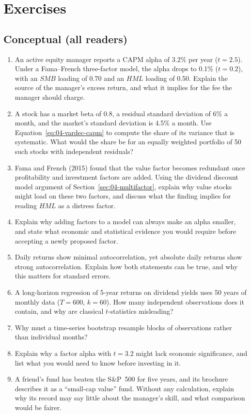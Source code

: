\section*{Exercises}

\subsection*{Conceptual (all readers)}
\begin{enumerate}
  \item An active equity manager reports a CAPM alpha of 3.2\% per year ($t = 2.5$). Under a Fama--French three-factor model, the alpha drops to 0.1\% ($t = 0.2$), with an $SMB$ loading of 0.70 and an $HML$ loading of 0.50. Explain the source of the manager's excess return, and what it implies for the fee the manager should charge.
  \item A stock has a market beta of 0.8, a residual standard deviation of 6\% a month, and the market's standard deviation is 4.5\% a month. Use Equation~\eqref{eq:04-vardec-capm} to compute the share of its variance that is systematic. What would the share be for an equally weighted portfolio of 50 such stocks with independent residuals?
  \item Fama and French (2015) found that the value factor becomes redundant once profitability and investment factors are added. Using the dividend discount model argument of Section~\ref{sec:04-multifactor}, explain why value stocks might load on these two factors, and discuss what the finding implies for reading $HML$ as a distress factor.
  \item Explain why adding factors to a model can always make an alpha smaller, and state what economic and statistical evidence you would require before accepting a newly proposed factor.
  \item Daily returns show minimal autocorrelation, yet absolute daily returns show strong autocorrelation. Explain how both statements can be true, and why this matters for standard errors.
  \item A long-horizon regression of 5-year returns on dividend yields uses 50 years of monthly data ($T=600$, $k=60$). How many independent observations does it contain, and why are classical $t$-statistics misleading?
  \item Why must a time-series bootstrap resample blocks of observations rather than individual months?
  \item Explain why a factor alpha with $t = 3.2$ might lack economic significance, and list what you would need to know before investing in it.
  \item A friend's fund has beaten the S\&P~500 for five years, and its brochure describes it as a ``small-cap value'' fund. Without any calculation, explain why its record may say little about the manager's skill, and what comparison would be fairer.
\end{enumerate}

